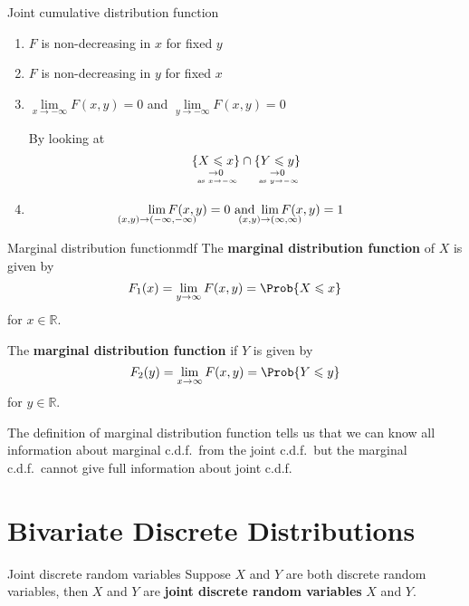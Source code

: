 \begin{Definition}{Joint cumulative distribution function}{}
    \begin{enumerate}[label=(\Roman*)]
        \item $ F $ is non-decreasing in $ x $ for fixed $ y $
        \item $ F $ is non-decreasing in $ y $ for fixed $ x $
        \item $ \displaystyle \lim\limits_{{x} \to {-\infty}} F(x,y)=0 $
              and $ \displaystyle \lim\limits_{{y} \to {-\infty}} F(x,y)=0 $

              By looking at
              \[ \underset{\underset{\text{ as }x\to-\infty}{\to 0}}{\{X\leqslant x\}}\cap
                  \underset{\underset{\text{ as }y\to-\infty}{\to 0}}{\{Y\leqslant y\}} \]
        \item \[ \displaystyle
                  \smashoperator{\lim\limits_{{(x,y)} \to {(-\infty,-\infty)}}}
                  F(x,y)=0\text{ and }
                  \displaystyle
                  \smashoperator{\lim\limits_{{(x,y)} \to {(\infty,\infty)}}}
                  F(x,y)=1 \]
    \end{enumerate}
\end{Definition}

\begin{Definition}{Marginal distribution function}{mdf}
    The \textbf{marginal distribution function} of $ X $ is given by
    \[ F_1(x)=\lim\limits_{{y} \to {\infty}} F(x,y)=\Prob{X\leqslant x} \]
    for $ x\in\mathbb{R} $.

    The \textbf{marginal distribution function} if $ Y $ is given by
    \[ F_2(y)=\lim\limits_{{x} \to {\infty}} F(x,y)=\Prob{Y\leqslant y} \]
    for $ y\in\mathbb{R} $.
\end{Definition}
\begin{Remark}{}{}
    The definition of marginal distribution
    function tells us that we can know all information
    about marginal c.d.f.\ from the joint c.d.f.\ but the
    marginal c.d.f.\ cannot give full information about
    joint c.d.f.\
\end{Remark}
\section{Bivariate Discrete Distributions}
\begin{Definition}{Joint discrete random variables}{}
    Suppose $ X $ and $ Y $ are both discrete random variables,
    then $ X $ and $ Y $ are \textbf{joint discrete random variables}
    $ X $ and $ Y $.
\end{Definition}

